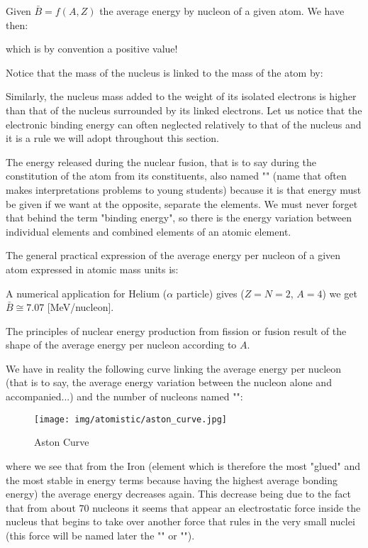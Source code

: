 	Given $\bar{B}=f(A,Z)$ the average energy by nucleon of a given atom. We have then:
	
	which is by convention a positive value!

	Notice that the mass of the nucleus is linked to the mass of the atom by:
	
	Similarly, the nucleus mass added to the weight of its isolated electrons is higher than that of the nucleus surrounded by its linked electrons. Let us notice that the electronic binding energy can often neglected relatively to that of the nucleus and it is a rule we will adopt throughout this section.

	The energy released during the nuclear fusion, that is to say during the constitution of the atom from its constituents, also named "" (name that often makes  interpretations problems to young students) because it is that energy must be given if we want at the opposite, separate the elements. We must never forget that behind the term "binding energy", so there is the energy variation between individual elements and combined elements of an atomic element.
	
	The general practical expression of the average energy per nucleon of a given atom expressed in atomic mass units is:
	
	A numerical application for Helium ($\alpha$ particle) gives ($Z=N=2$, $A=4$) we get $\bar{B}\cong 7.07$ [MeV/nucleon].
	
	The principles of nuclear energy production from fission or fusion result of the shape of the average energy per nucleon according to $A$.

	We have in reality the following curve linking the average energy per nucleon (that is to say, the average energy variation between the nucleon alone and accompanied...) and the number of nucleons named "":
	\begin{figure}[H]
		\centering
		\texttt{[image: img/atomistic/aston\_curve.jpg]}
		\caption{Aston Curve}
	\end{figure}
	where we see that from the Iron (element which is therefore the most "glued" and the most stable in energy terms because having the highest average bonding energy) the average energy decreases again. This decrease being due to the fact that from about $70$ nucleons it seems that appear an electrostatic force inside the nucleus that begins to take over another force that rules in the very small nuclei (this force will be named later the "" or "").

